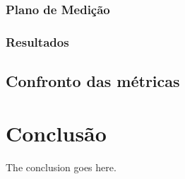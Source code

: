 \documentclass[conference]{IEEEtran}
\begin{document}
    \subsubsection{Plano de Medição} \label{plano_medicao}
    
    \subsubsection{Resultados} \label{resultados_levantamento}

  \subsection{Confronto das métricas}
  

\section{Conclusão}
The conclusion goes here.





% 
% 


%
%
\end{document}
